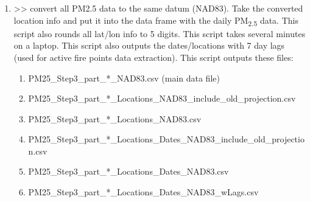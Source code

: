 \begin{enumerate}[nolistsep]
\begin{enumerate}[nolistsep]
	\end{enumerate}

\item {} >> convert all PM2.5 data to the same datum (NAD83). Take the converted location info and put it into the data frame with the daily PM\textsubscript{2.5} data. This script also rounds all lat/lon info to 5 digits. This script takes several minutes on a laptop. This script also outputs the dates/locations with 7 day lags (used for active fire points data extraction). This script outputs these files:

\begin{enumerate}[nolistsep]
\item PM25\_Step3\_part\_*\_NAD83.csv (main data file)
\item PM25\_Step3\_part\_*\_Locations\_NAD83\_include\_old\_projection.csv
\item PM25\_Step3\_part\_*\_Locations\_NAD83.csv
\item PM25\_Step3\_part\_*\_Locations\_Dates\_NAD83\_include\_old\_projection.csv
\item PM25\_Step3\_part\_*\_Locations\_Dates\_NAD83.csv
\item PM25\_Step3\_part\_*\_Locations\_Dates\_NAD83\_wLags.csv
\end{enumerate}


\end{enumerate}
